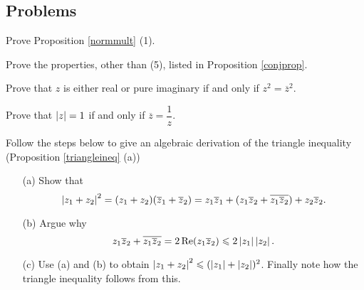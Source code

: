 \vspace*{2em}

\subsection{Problems}
\vspace{0.1in}

\begin{problem}\label{prob 2.1a}
Prove Proposition \ref{normmult} (1).
\end{problem}

\vspace*{0.1in}

\begin{problem}\label{prob 2.1}
Prove the properties, other than (5), listed in Proposition \ref{conjprop}.
\end{problem}

\vspace{0.1in}

\begin{problem}\label{prob 2.2}
Prove that $z$ is either real or pure imaginary if and only if $z^2 = \overline{z}^2$.
\end{problem}

\vspace{0.1in}

\begin{problem}\label{prob 2.3}
Prove that $\left\lvert z\right\rvert = 1$ if and only if $\overline{z} = \dfrac{1}{z}$. 
\end{problem}

\vspace{0.1in}

\begin{problem}\label{prob 2.4}
Follow the steps below to give an algebraic derivation of the triangle inequality (Proposition \ref{triangleineq} (a))
\begin{itemize}
\item[(a)] Show that
\[\left\lvert z_1 + z_2\right\rvert^2 = (z_1 + z_2)(\overline{z}_1 + \overline{z}_2) = z_1\overline{z}_1 + (z_1\overline{z}_2 + \overline{z_1\overline{z}_2}) + z_2\overline{z}_2.\]
\item[(b)] Argue why
\[z_1\overline{z}_2 + \overline{z_1\overline{z}_2} = 2\operatorname{Re}(z_1\overline{z}_2) \leqslant 2\left\lvert z_1\right\rvert\left\lvert z_2\right\rvert.\]
\item[(c)] Use (a) and (b) to obtain $\left\lvert z_1 + z_2\right\rvert^2 \leqslant (\left\lvert z_1\right\rvert + \left\lvert z_2\right\rvert)^2$. Finally note how the triangle inequality follows from this.
\end{itemize}
\end{problem}

